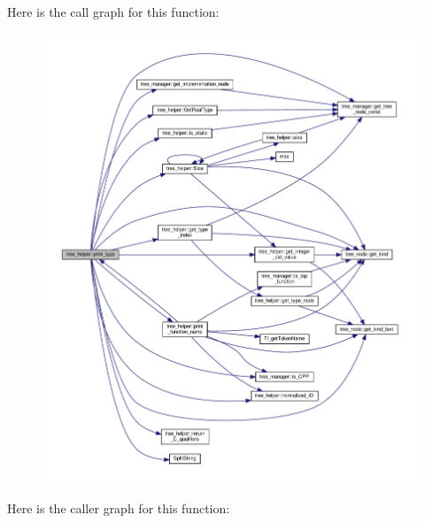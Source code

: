 Here is the call graph for this function\+:
\nopagebreak
\begin{figure}[H]
\begin{center}
\leavevmode
\includegraphics[width=350pt]{d7/d99/classtree__helper_ae3199a84c9560139e1bbbaf3b5b1e519_cgraph}
\end{center}
\end{figure}
Here is the caller graph for this function\+:
\nopagebreak
